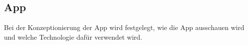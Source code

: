 \subsection{App}
Bei der Konzeptionierung der App wird festgelegt, wie die App ausschauen wird und welche Technologie dafür verwendet wird.



\clearpage

